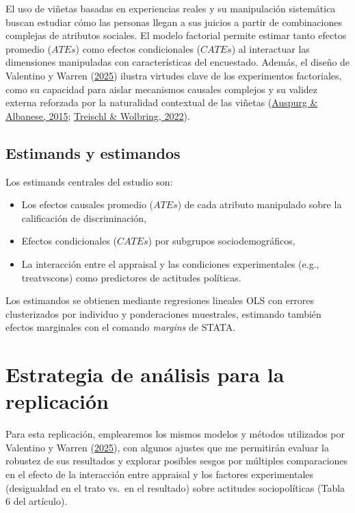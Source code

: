 \documentclass[
  13pt,
  a4paper,
]{article}
\providecommand{\tightlist}{%
  \setlength{\itemsep}{0pt}\setlength{\parskip}{0pt}}
\begin{document}
El uso de viñetas basadas en experiencias reales y su manipulación sistemática buscan estudiar cómo las personas llegan a sus juicios a partir de combinaciones complejas de atributos sociales. El modelo factorial permite estimar tanto efectos promedio (\(ATEs\)) como efectos condicionales (\(CATEs\)) al interactuar las dimensiones manipuladas con características del encuestado. Además, el diseño de Valentino y Warren (\protect\hyperlink{ref-valentino_cultural_2025}{2025}) ilustra virtudes clave de los experimentos factoriales, como su capacidad para aislar mecanismos causales complejos y su validez externa reforzada por la naturalidad contextual de las viñetas (\protect\hyperlink{ref-auspurg_factorial_2015}{Auspurg \& Albanese, 2015}; \protect\hyperlink{ref-treischl_present_2022}{Treischl \& Wolbring, 2022}).

\hypertarget{estimands-y-estimandos}{%
\subsection{Estimands y estimandos}\label{estimands-y-estimandos}}

Los estimands centrales del estudio son:

\begin{itemize}
\tightlist
\item
  Los efectos causales promedio (\(ATEs\)) de cada atributo manipulado sobre la calificación de discriminación,
\item
  Efectos condicionales (\(CATEs\)) por subgrupos sociodemográficos,
\item
  La interacción entre el appraisal y las condiciones experimentales (e.g., treatvscons) como predictores de actitudes políticas.
\end{itemize}

Los estimandos se obtienen mediante regresiones lineales OLS con errores clusterizados por individuo y ponderaciones muestrales, estimando también efectos marginales con el comando \emph{margins} de STATA.

\hypertarget{estrategia-de-anuxe1lisis-para-la-replicaciuxf3n}{%
\section{Estrategia de análisis para la replicación}\label{estrategia-de-anuxe1lisis-para-la-replicaciuxf3n}}

Para esta replicación, emplearemos los mismos modelos y métodos utilizados por Valentino y Warren (\protect\hyperlink{ref-valentino_cultural_2025}{2025}), con algunos ajustes que me permitirán evaluar la robustez de sus resultados y explorar posibles sesgos por múltiples comparaciones en el efecto de la interacción entre appraisal y los factores experimentales (desigualdad en el trato vs.~en el resultado) sobre actitudes sociopolíticas (Tabla 6 del artículo).
\end{document}
